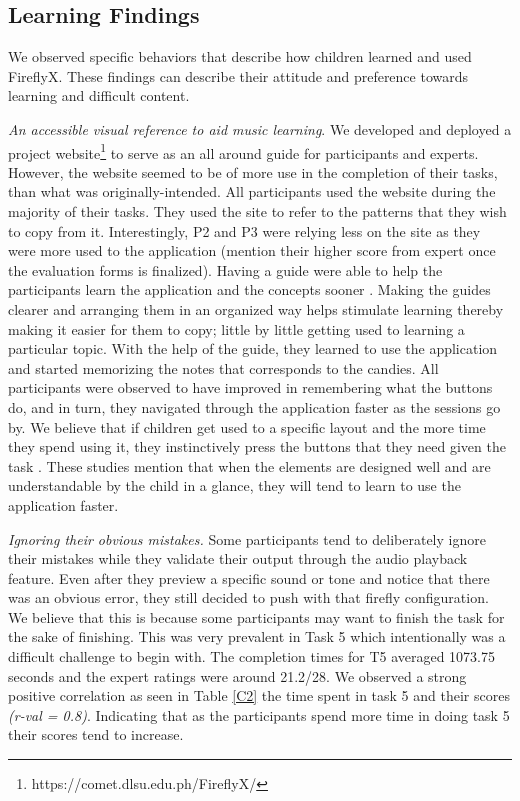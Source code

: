 \subsection{Learning Findings}
We observed specific behaviors that describe how children learned and used FireflyX. These findings can describe their attitude and preference towards learning and difficult content. 

\textit{An accessible visual reference to aid music learning}. We developed and deployed a project website\footnote{https://comet.dlsu.edu.ph/FireflyX/} to serve as an all around guide for participants and experts. However, the website seemed to be of more use in the completion of their tasks, than what was originally-intended. All participants used the website during the majority of their tasks. They used the site to refer to the patterns that they wish to copy from it.  Interestingly, P2 and P3 were relying less on the site as they were more used to the application (mention their higher score from expert once the evaluation forms is finalized). Having a guide were able to help the participants learn the application and the concepts sooner \cite{pashler2007organizing}. Making the guides clearer and arranging them in an organized way helps stimulate learning thereby making it easier for them to copy; little by little getting used to learning a particular topic. With the help of the guide, they learned to use the application and started memorizing the notes that corresponds to the candies. All participants were observed to have improved in remembering what the buttons do, and in turn, they navigated through the application faster as the sessions go by. We believe that if children get used to a specific layout and the more time they spend using it, they instinctively press the buttons that they need given the task \cite{wiedenbeck1999use, ibharim2014ibuat}. These studies mention that when the elements are designed well and are understandable by the child in a glance, they will tend to learn to use the application faster.

\textit{Ignoring their obvious mistakes.} Some participants tend to deliberately ignore their mistakes while they validate their output through the audio playback feature. Even after they preview a specific sound or tone and notice that there was an obvious error, they still decided to push with that firefly configuration. We believe that this is because some participants may want to finish the task for the sake of finishing. This was very prevalent in Task 5 which intentionally was a difficult challenge to begin with. The completion times for T5 averaged 1073.75 seconds and the expert ratings were around  21.2/28. We observed a strong positive correlation as seen in Table \ref{C2} \with the time spent in task 5 and their scores  \textit{(r-val = 0.8)}. Indicating that as the participants spend more time in doing task 5 their scores tend to increase.

